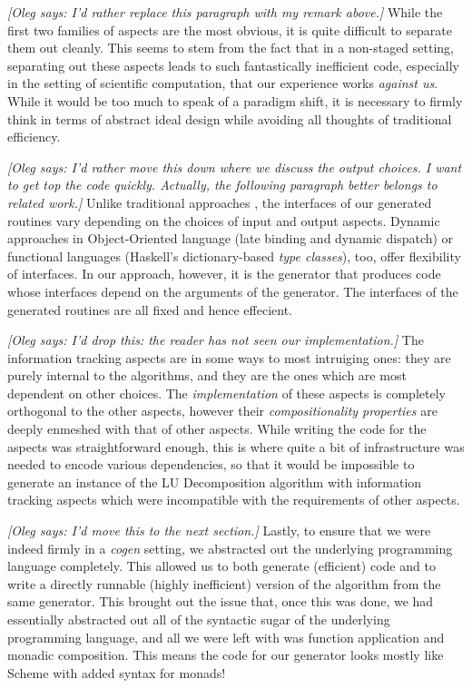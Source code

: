 \documentclass[draft]{elsart}
\newcommand{\oleg}[1]{{\it [Oleg says: #1]}}
\begin{document}
\oleg{I'd rather replace this paragraph with my remark above.}
While the first two families of aspects are the most obvious, it is quite
difficult to separate them out cleanly.  This seems to stem from the fact
that in a non-staged setting, separating out these aspects leads to such
fantastically inefficient code, especially in the setting of scientific
computation, that our experience works \emph{against us}.  While it would
be too much to speak of a paradigm shift, it is necessary to firmly think
in terms of abstract ideal design while avoiding all thoughts of traditional
efficiency.

\oleg{I'd rather move this down where we discuss the output choices. I
  want to get top the code quickly. Actually, the following paragraph
  better belongs to related work.}  
Unlike traditional approaches
\cite{journals/cacm/parnas72a}, the interfaces of our generated
routines vary depending on the choices of input and output
aspects. Dynamic approaches in Object-Oriented language (late binding
and dynamic dispatch) or functional languages (Haskell's
dictionary-based \emph{type classes}), too, offer flexibility of
interfaces. In our approach, however, it is the generator that
produces code whose interfaces depend on the arguments of the
generator. The interfaces of the generated routines are all fixed and
hence effecient.

\oleg{I'd drop this: the reader has not seen our implementation.}
The information tracking aspects are in some ways to most intruiging ones:
they are purely internal to the algorithms, and they are the ones which
are most dependent on other choices.  The \emph{implementation} of these
aspects is completely orthogonal to the other aspects, however their
\emph{compositionality properties} are deeply enmeshed with that of other
aspects.  While writing the code for the aspects was straightforward enough,
this is where quite a bit of infrastructure was needed to encode
various dependencies, so that it would be impossible to generate an
instance of the LU Decomposition algorithm with information
tracking aspects which were incompatible with the requirements of other
aspects.

\oleg{I'd move this to the next section.}
Lastly, to ensure that we were indeed firmly in a \emph{cogen} setting,
we abstracted out the underlying programming language completely.  This 
allowed us to both generate (efficient) code and to write a directly
runnable (highly inefficient) version of the algorithm from the same
generator.  This brought out the issue that, once this was done, we had
essentially abstracted out all of the syntactic sugar of the underlying
programming language, and all we were left with was function application
and monadic composition.  This means the code for our generator looks mostly
like Scheme with added syntax for monads!
\end{document}
